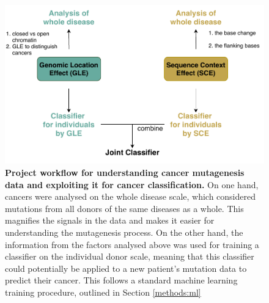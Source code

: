 \begin{figure}[h!]
    \centering
    \includegraphics[scale=0.9]{graphics/workflow.pdf}
    \caption{\textbf{Project workflow for understanding cancer mutagenesis data and exploiting it for cancer classification.} On one hand, cancers were analysed on the whole disease scale, which considered mutations from all donors of the same diseases as a whole. This magnifies the signals in the data and makes it easier for understanding the mutagenesis process. On the other hand, the information from the factors analysed above was used for training a classifier on the individual donor scale, meaning that this classifier could potentially be applied to a new patient's mutation data to predict their cancer. This follows a standard machine learning training procedure, outlined in Section \ref{methods:ml}}
    \label{fig:workflow}
\end{figure}

